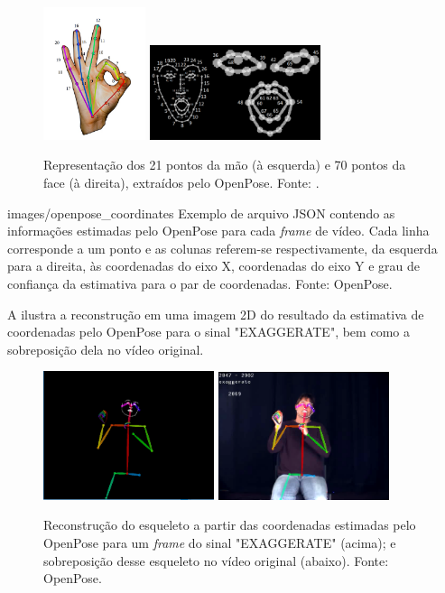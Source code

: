 \begin{figure}[ht]
    \centering
    \includegraphics[width=3cm]{images/keypoints_hand}
    \includegraphics[width=5cm]{images/keypoints_face}
    \caption{Representação dos 21 pontos da mão (à esquerda) e 70 pontos da face (à direita), extraídos pelo OpenPose. Fonte: \cite{openpose-output-2018}.}
    \label{fig:keypoints-face-hand}
\end{figure}

    {images/openpose_coordinates}
    {Exemplo de arquivo JSON contendo as informações estimadas pelo OpenPose para cada \textit{frame} de vídeo. Cada linha corresponde a um ponto e as colunas referem-se respectivamente, da esquerda para a direita, às coordenadas do eixo X, coordenadas do eixo Y e grau de confiança da estimativa para o par de coordenadas. Fonte: OpenPose.}

A  ilustra a reconstrução em uma imagem 2D do resultado da estimativa de coordenadas pelo OpenPose para o sinal "EXAGGERATE", bem como a sobreposição dela no vídeo original.

\begin{figure}[ht]
    \centering
    \includegraphics[width=5cm]{images/sign_pose}
    \includegraphics[width=5cm]{images/sign_pose_blended}
    \caption{Reconstrução do esqueleto a partir das coordenadas estimadas pelo OpenPose para um \textit{frame} do sinal "EXAGGERATE" (acima); e sobreposição desse esqueleto no vídeo original (abaixo). Fonte: OpenPose.}
    \label{fig:sign-pose}
\end{figure}

